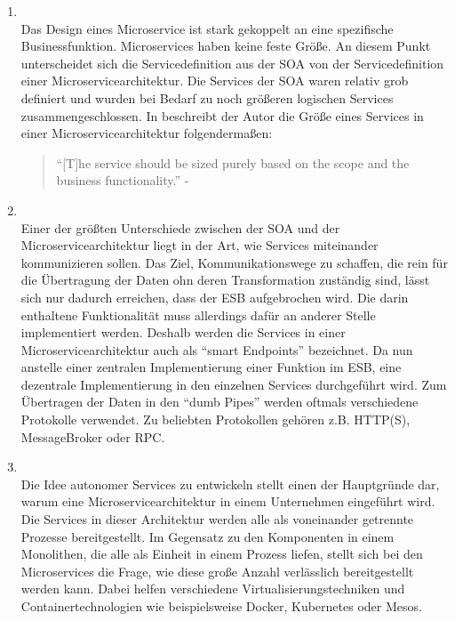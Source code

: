 \begin{definition}
	\hfill
	\begin{enumerate}
		\item {}\\
		Das Design eines Microservice ist stark gekoppelt an eine spezifische Businessfunktion.\autocite[S. 8]{microservice_enterprise} Microservices haben keine feste Größe. An diesem Punkt unterscheidet sich die Servicedefinition aus der \ac{SOA} von der Servicedefinition einer Microservicearchitektur. Die Services der \ac{SOA} waren relativ grob definiert und wurden bei Bedarf zu noch größeren logischen Services zusammengeschlossen. In  beschreibt der Autor die Größe eines Services in einer Microservicearchitektur folgendermaßen:
		\begin{quote}
			\enquote{[T]he service should be sized purely based on the scope and the business functionality.} - \citeauthor{microservice_enterprise}
		\end{quote}
		\item {}\\
		Einer der größten Unterschiede zwischen der \ac{SOA} und der Microservicearchitektur liegt in der Art, wie Services miteinander kommunizieren sollen. Das Ziel, Kommunikationswege zu schaffen, die rein für die Übertragung der Daten ohn deren Transformation zuständig sind, lässt sich nur dadurch erreichen, dass der \ac{ESB} aufgebrochen wird. Die darin enthaltene Funktionalität muss allerdings dafür an anderer Stelle implementiert werden. Deshalb werden die Services in einer Microservicearchitektur auch als \enquote{smart Endpoints} bezeichnet. Da nun anstelle einer zentralen Implementierung einer Funktion im \ac{ESB}, eine dezentrale Implementierung in den einzelnen Services durchgeführt wird. Zum Übertragen der Daten in den \enquote{dumb Pipes} werden oftmals verschiedene Protokolle verwendet. Zu beliebten Protokollen gehören z.B. HTTP(S), MessageBroker oder \ac{RPC}.
		\item {}\\
		Die Idee autonomer Services zu entwickeln stellt einen der Hauptgründe dar, warum eine Microservicearchitektur in einem Unternehmen eingeführt wird. Die Services in dieser Architektur werden alle als voneinander getrennte Prozesse bereitgestellt. Im Gegensatz zu den Komponenten in einem Monolithen, die alle als Einheit in einem Prozess liefen, stellt sich bei den Microservices die Frage, wie diese große Anzahl verlässlich bereitgestellt werden kann. Dabei helfen verschiedene Virtualisierungstechniken und Containertechnologien wie beispielsweise Docker, Kubernetes oder Mesos.

\end{enumerate}
\end{definition}

